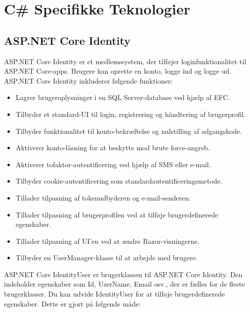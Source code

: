\section{C\# Specifikke Teknologier}
\subsection{ASP.NET Core Identity}
ASP.NET Core Identity er et medlemssystem, der tilføjer loginfunktionalitet til ASP.NET Core-apps. Brugere kan oprette en konto, logge ind og logge ud. ASP.NET Core Identity inkluderer følgende funktioner:
\begin{itemize}
    \item Lagrer brugeroplysninger i en SQL Server-database ved hjælp af EFC.
    \item Tilbyder et standard-UI til login, registrering og håndtering af brugerprofil.
    \item Tilbyder funktionalitet til konto-bekræftelse og nulstilling af adgangskode.
    \item Aktiverer konto-låsning for at beskytte mod brute force-angreb.
    \item Aktiverer tofaktor-autentificering ved hjælp af SMS eller e-mail.
    \item Tilbyder cookie-autentificering som standardautentificeringsmetode.
    \item Tillader tilpasning af tokenudbyderen og e-mail-senderen.
    \item Tillader tilpasning af brugerprofilen ved at tilføje brugerdefinerede egenskaber.
    \item Tillader tilpasning af UI'en ved at ændre Razor-visningerne.
    \item Tilbyder en UserManager-klasse til at arbejde med brugere.
\end{itemize}
ASP.NET Core IdentityUser er brugerklassen til ASP.NET Core Identity. Den indeholder egenskaber som Id, UserName, Email osv., der er fælles for de fleste brugerklasser. Du kan udvide IdentityUser for at tilføje brugerdefinerede egenskaber.
Dette er gjort på følgende måde:
